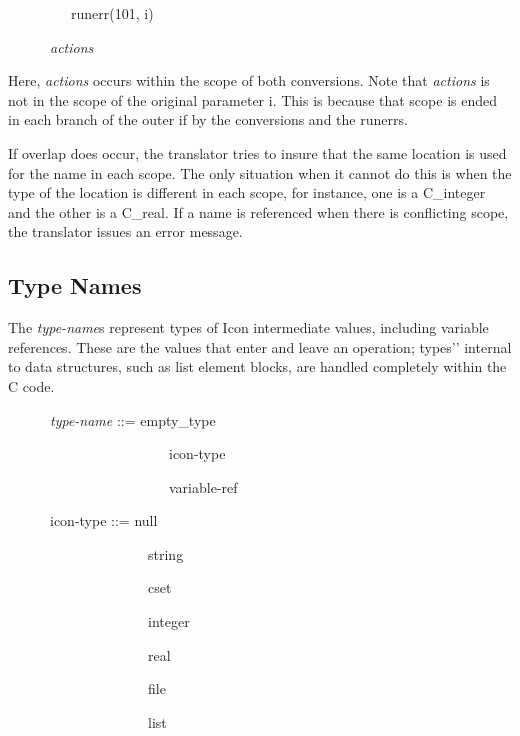 {\ttfamily\mdseries
\ \ \ \ \ \ \ \ \ runerr(101, i)}

{\ttfamily\mdseries
\ \ \ \ \ \ \textit{actions}}


Here, \textit{actions} occurs within the scope of both
conversions. Note that \textit{actions} is not in the scope of the
original parameter i. This is because that scope is ended in each
branch of the outer if by the conversions and the runerrs.

If overlap does occur, the translator tries to insure that the same
location is used for the name in each scope. The only situation when
it cannot do this is when the type of the location is different in
each scope, for instance, one is a C\_integer and the other is a
C\_real. If a name is referenced when there is conflicting scope, the
translator issues an error message.

\subsection{Type Names}

The \textit{type-name}s represent types of Icon intermediate values,
including variable references. These are the values that enter and
leave an operation; {\textasciigrave}{\textasciigrave}types'{}'
internal to data structures, such as list element blocks, are handled
completely within the C code.

{\ttfamily\mdseries
\ \ \ \ \ \ \textit{type-name} ::= empty\_type {\textbar}}

{\ttfamily\mdseries
\ \ \ \ \ \ \ \ \ \ \ \ \ \ \ \ \ \ \ \ \ \ \ icon-type {\textbar}}

{\ttfamily\mdseries
\ \ \ \ \ \ \ \ \ \ \ \ \ \ \ \ \ \ \ \ \ \ \ variable-ref}

{\ttfamily\mdseries
\ \ \ \ \ \ icon-type ::= null {\textbar}}

{\ttfamily\mdseries
\ \ \ \ \ \ \ \ \ \ \ \ \ \ \ \ \ \ \ \ string {\textbar}}

{\ttfamily\mdseries
\ \ \ \ \ \ \ \ \ \ \ \ \ \ \ \ \ \ \ \ cset {\textbar}}

{\ttfamily\mdseries
\ \ \ \ \ \ \ \ \ \ \ \ \ \ \ \ \ \ \ \ integer {\textbar}}

{\ttfamily\mdseries
\ \ \ \ \ \ \ \ \ \ \ \ \ \ \ \ \ \ \ \ real {\textbar}}

{\ttfamily\mdseries
\ \ \ \ \ \ \ \ \ \ \ \ \ \ \ \ \ \ \ \ file {\textbar}}

{\ttfamily\mdseries
\ \ \ \ \ \ \ \ \ \ \ \ \ \ \ \ \ \ \ \ list {\textbar}}

